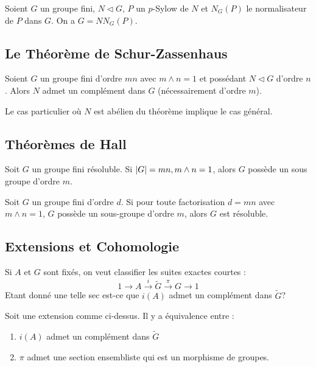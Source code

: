 \documentclass{cours}
\begin{document}
\begin{lemma}[Frattini]
    Soient $G$ un groupe fini, $N \lhd G$, $P$ un $p$-Sylow de $N$ et $N_{G}(P)$ le normalisateur de $P$ dans $G$. On a $G = N N_{G}(P)$.
\end{lemma}

\subsection{Le Théorème de Schur-Zassenhaus}
\begin{theorem}
    Soient $G$ un groupe fini d'ordre $mn$ avec $m\wedge n = 1$ et possédant $N \lhd G$ d'ordre $n$. Alors $N$ admet un complément dans $G$ (nécessairement d'ordre $m$).
\end{theorem}

\begin{lemma}
    Le cas particulier où $N$ est abélien du théorème implique le cas général. 
\end{lemma}

\subsection{Théorèmes de Hall}
\begin{theorem}[P.Hall]
    Soit $G$ un groupe fini résoluble. Si $\left|G\right| = mn, m\land n = 1$, alors $G$ possède un sous groupe d'ordre $m$.
\end{theorem}

\begin{theorem}[P.Hall]
    Soit $G$ un groupe fini d'ordre $d$. Si pour toute factorisation $d = mn$ avec $m\land n = 1$, $G$ possède un sous-groupe d'ordre $m$, alors $G$ est résoluble. 
\end{theorem}

\subsection{Extensions et Cohomologie}
Si $A$ et $G$ sont fixés, on veut classifier les suites exactes courtes :
\begin{equation}\label{Extension}
    1 \rightarrow A \xrightarrow{i} \tilde{G} \xrightarrow{\pi} G \rightarrow 1   
\end{equation}
Etant donné une telle sec est-ce que $i(A)$ admet un complément dans $\tilde{G}$?

\begin{lemma}
    Soit une extension comme ci-dessus. Il y a équivalence entre : 
    \begin{enumerate}
        \item $i(A)$ admet un complément dans $\tilde{G}$
        \item $\pi$ admet une section ensembliste qui est un morphisme de groupes. 
    \end{enumerate}
\end{lemma}
\end{document}
